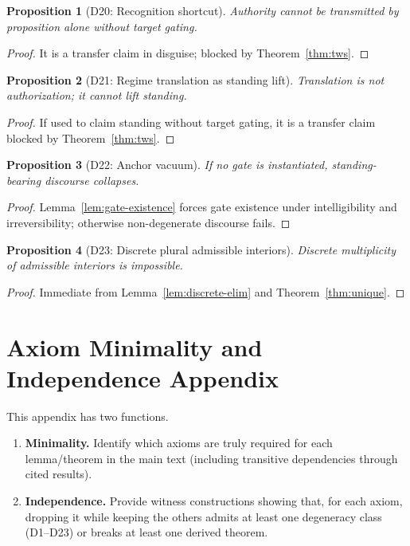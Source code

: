 \documentclass[12pt]{article}
\newtheorem{proposition}{Proposition}
\begin{document}
\begin{proposition}[D20: Recognition shortcut]
Authority cannot be transmitted by proposition alone without target gating.
\end{proposition}
\begin{proof}
It is a transfer claim in disguise; blocked by Theorem~\ref{thm:tws}. \end{proof}

\begin{proposition}[D21: Regime translation as standing lift]
Translation is not authorization; it cannot lift standing.
\end{proposition}
\begin{proof}
If used to claim standing without target gating, it is a transfer claim blocked by Theorem~\ref{thm:tws}. \end{proof}

\begin{proposition}[D22: Anchor vacuum]
If no gate is instantiated, standing-bearing discourse collapses.
\end{proposition}
\begin{proof}
Lemma~\ref{lem:gate-existence} forces gate existence under intelligibility and irreversibility; otherwise non-degenerate discourse fails. \end{proof}

\begin{proposition}[D23: Discrete plural admissible interiors]
Discrete multiplicity of admissible interiors is impossible.
\end{proposition}
\begin{proof}
Immediate from Lemma~\ref{lem:discrete-elim} and Theorem~\ref{thm:unique}. \end{proof}

\section{Axiom Minimality and Independence Appendix}
\label{app:minindep}

This appendix has two functions.

\begin{enumerate}[label=(\alph*), leftmargin=2.2em]
\item \textbf{Minimality.} Identify which axioms are truly required for each lemma/theorem in the main text (including transitive dependencies through cited results).
\item \textbf{Independence.} Provide witness constructions showing that, for each axiom, dropping it while keeping the others admits at least one degeneracy class (D1--D23) or breaks at least one derived theorem.
\end{enumerate}
\end{document}
